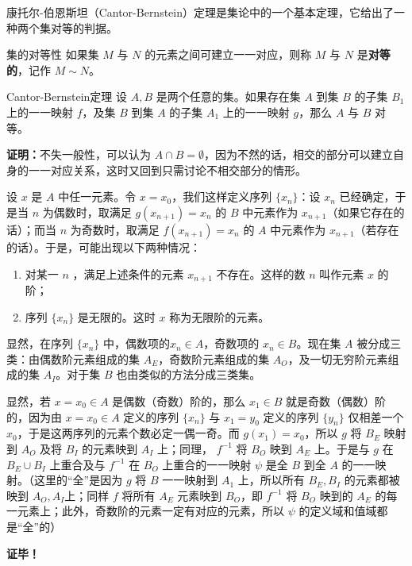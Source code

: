康托尔-伯恩斯坦（Cantor-Bernstein）定理是集论中的一个基本定理，它给出了一种两个集对等的判据。
\begin{definition}{集的对等性}
如果集 $M$ 与 $N$ 的元素之间可建立一一对应，则称 $M$ 与 $N$ 是\textbf{对等的}，记作 $M\sim N$。
\end{definition}
\begin{theorem}{Cantor-Bernstein定理}
设 $A,B$ 是两个任意的集。如果存在集 $A$ 到集 $B$ 的子集 $B_1$ 上的一一映射 $f$，及集 $B$ 到集 $A$ 的子集 $A_1$ 上的一一映射 $g$，那么 $A$ 与 $B$ 对等。
\end{theorem}
\textbf{证明：}不失一般性，可以认为 $A\cap B=\emptyset$，因为不然的话，相交的部分可以建立自身的一一对应关系，这时又回到只需讨论不相交部分的情形。

设 $x$ 是 $A$ 中任一元素。令 $x=x_0$，我们这样定义序列 $\{x_n\}$：设 $x_n$ 已经确定，于是当 $n$ 为偶数时，取满足 $g(x_{n+1})=x_n$ 的 $B$ 中元素作为 $x_{n+1}$（如果它存在的话）；而当 $n$ 为奇数时，取满足 $f(x_{n+1})=x_n$ 的 $A$ 中元素作为 $x_{n+1}$（若存在的话）。于是，可能出现以下两种情况：
\begin{enumerate}
\item 对某一 $n$ ，满足上述条件的元素 $x_{n+1}$ 不存在。这样的数 $n$ 叫作元素 $x$ 的阶；
\item 序列 $\{x_n\}$ 是无限的。这时 $x$ 称为无限阶的元素。
\end{enumerate}
显然，在序列 $\{x_n\}$ 中，偶数项的$x_n\in A$，奇数项的 $x_n\in B$。现在集 $A$ 被分成三类：由偶数阶元素组成的集 $A_E$，奇数阶元素组成的集 $A_O$，及一切无穷阶元素组成的集 $A_I$。对于集 $B$ 也由类似的方法分成三类集。

显然，若 $x=x_0\in A$ 是偶数（奇数）阶的，那么 $x_1\in B$ 就是奇数（偶数）阶的，因为由 $x=x_0\in A$ 定义的序列 $\{x_n\}$ 与 $x_1=y_0$ 定义的序列 $\{y_n\}$ 仅相差一个 $x_0$，于是这两序列的元素个数必定一偶一奇。而 $g(x_1)=x_0$，所以 $g$ 将 $B_E$ 映射到 $A_O$ 及将 $B_I$ 的元素映到 $A_I$ 上；同理， $f^{-1}$ 将 $B_O$ 映到 $A_E$ 上。于是与 $g$ 在 $B_E\cup B_I$ 上重合及与 $f^{-1}$ 在 $B_O$ 上重合的一一映射 $\psi$ 是全 $B$ 到全 $A$ 的一一映射。（这里的“全”是因为 $g$ 将 $B$ 一一映射到 $A_1$ 上，所以所有 $B_E,B_I$ 的元素都被映到 $A_O,A_I$上；同样 $f$ 将所有 $A_E$ 元素映到 $B_O$，即 $f^{-1}$ 将 $B_O$ 映到的 $A_E$ 的每一元素上；此外，奇数阶的元素一定有对应的元素，所以 $\psi$ 的定义域和值域都是“全”的）

\textbf{证毕！}